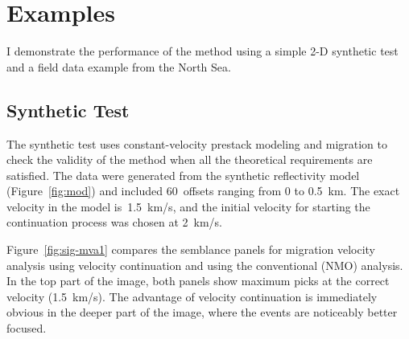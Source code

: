 
\section{Examples}

I demonstrate the performance of the method using a simple 2-D synthetic
test and a field data example from the North Sea.

\subsection{Synthetic Test}

The synthetic test uses constant-velocity prestack modeling and migration to
check the validity of the method when all the theoretical requirements are
satisfied. The data were generated from the synthetic reflectivity model
(Figure~\ref{fig:mod}) and included 60~offsets ranging from 0 to 0.5~km.
The exact velocity in the model is~1.5~km/s, and the initial velocity for
starting the continuation process was chosen at 2~km/s.


Figure~\ref{fig:sig-mva1} compares the semblance panels for migration
velocity analysis using velocity continuation and using the
conventional (NMO) analysis. In the top part of the image, both panels
show maximum picks at the correct velocity (1.5~km/s).  The advantage
of velocity continuation is immediately obvious in the deeper part of
the image, where the events are noticeably better focused.


